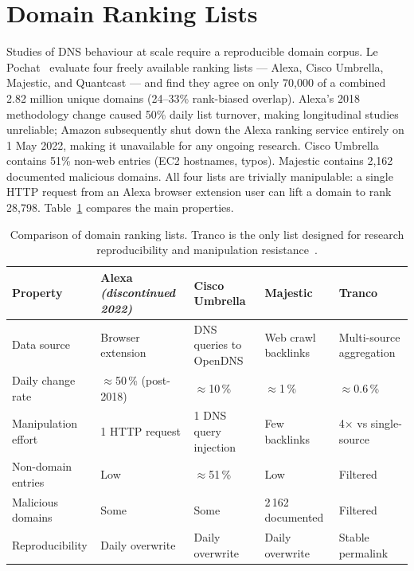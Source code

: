 \section{Domain Ranking Lists}
\label{sec:2.6}

Studies of \ac{DNS} behaviour at scale require a reproducible domain corpus. Le Pochat~\cite{LePochat2019} evaluate four freely available ranking lists — Alexa, Cisco Umbrella, Majestic, and Quantcast — and find they agree on only 70,000 of a combined 2.82 million unique domains (24–33\% rank-biased overlap). Alexa’s 2018 methodology change caused 50\% daily list turnover, making longitudinal studies unreliable; Amazon subsequently shut down the Alexa ranking service entirely on 1 May 2022, making it unavailable for any ongoing research. Cisco Umbrella contains 51\% non-web entries (EC2 hostnames, typos). Majestic contains 2,162 documented malicious domains. All four lists are trivially manipulable: a single \ac{HTTP} request from an Alexa browser extension user can lift a domain to rank 28,798. Table~\ref{tab:ranking_lists} compares the main properties.

\begin{table}[tp]
\centering
\small
\begin{tabularx}{\linewidth}{p{2.2cm} X X X X}
\toprule
\textbf{Property} & \textbf{Alexa} \newline \textit{(discontinued 2022)} & \textbf{Cisco Umbrella} & \textbf{Majestic} & \textbf{Tranco} \\
\midrule
Data source  & Browser extension & \ac{DNS} queries to OpenDNS & Web crawl backlinks & Multi-source aggregation \\
Daily change rate & $\approx$50\,\% (post-2018) & $\approx$10\,\% & $\approx$1\,\% & $\approx$0.6\,\% \\
Manipulation effort & 1 \ac{HTTP} request & 1 \ac{DNS} query injection & Few backlinks & 4$\times$ vs single-source \\
Non-domain entries & Low & $\approx$51\,\% & Low & Filtered \\
Malicious domains & Some & Some & 2\,162 documented & Filtered \\
Reproducibility   & Daily overwrite & Daily overwrite & Daily overwrite & Stable permalink \\
\bottomrule
\end{tabularx}
\caption{Comparison of domain ranking lists. Tranco is the only list designed for research reproducibility and manipulation resistance~\cite{LePochat2019}.}
\label{tab:ranking_lists}
\end{table}

